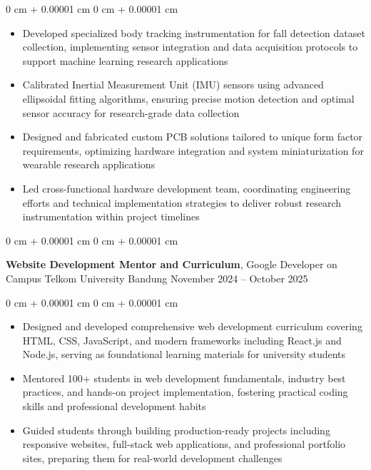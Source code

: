 \documentclass[10pt, a4paper]{article}
\newenvironment{highlights}{
    \begin{itemize}[
        topsep=0.10 cm,
        parsep=0.10 cm,
        partopsep=0pt,
        itemsep=0pt,
        leftmargin=0 cm + 10pt
    ]
}{
    \end{itemize}
} %
\newenvironment{onecolentry}{
    \begin{adjustwidth}{
        0 cm + 0.00001 cm
    }{
        0 cm + 0.00001 cm
    }
}{
    \end{adjustwidth}
} %
\newenvironment{twocolentry}[2][]{
    \onecolentry
    \def\secondColumn{#2}
    \setcolumnwidth{\fill, 4.5 cm}
    \begin{paracol}{2}
}{
    \switchcolumn \raggedleft \secondColumn
    \end{paracol}
    \endonecolentry
} %
\begin{document}
        \vspace{0.10 cm}
        \begin{onecolentry}
            \begin{highlights}
                \item Developed specialized body tracking instrumentation for fall detection dataset collection, implementing sensor integration and data acquisition protocols to support machine learning research applications
                \item Calibrated Inertial Measurement Unit (IMU) sensors using advanced ellipsoidal fitting algorithms, ensuring precise motion detection and optimal sensor accuracy for research-grade data collection
                \item Designed and fabricated custom PCB solutions tailored to unique form factor requirements, optimizing hardware integration and system miniaturization for wearable research applications
                \item Led cross-functional hardware development team, coordinating engineering efforts and technical implementation strategies to deliver robust research instrumentation within project timelines
            \end{highlights}
        \end{onecolentry}


        \vspace{0.2 cm}


      \begin{twocolentry}{
            November 2024 – October 2025
        }
            \textbf{Website Development Mentor and Curriculum}, Google Developer on Campus Telkom University Bandung\end{twocolentry}

        \vspace{0.10 cm}
        \begin{onecolentry}
            \begin{highlights}
                \item Designed and developed comprehensive web development curriculum covering HTML, CSS, JavaScript, and modern frameworks including React.js and Node.js, serving as foundational learning materials for university students
                \item Mentored 100+ students in web development fundamentals, industry best practices, and hands-on project implementation, fostering practical coding skills and professional development habits
                \item Guided students through building production-ready projects including responsive websites, full-stack web applications, and professional portfolio sites, preparing them for real-world development challenges
            \end{highlights}
        \end{onecolentry}
\end{document}
